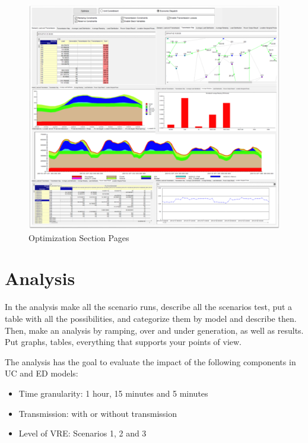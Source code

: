 \documentclass[12pt,LUDisStyle,twosided]{book}
\begin{document}
\begin{figure}[h] 
	\begin{center}
		\includegraphics[width=\textwidth,height=\textheight,keepaspectratio]{aimmsOptimizationSectionPages.png}
	  	\caption{Optimization Section Pages}
     	\label{fig:optimizationSectionPages}
	\end{center}
\end{figure}



\chapter{Analysis}

In the analysis make all the scenario runs, describe all the scenarios test, put a table with all the possibilities, and categorize them by model and describe then. Then, make an analysis by ramping, over and under generation, as well as results. Put graphs, tables, everything that supports your points of view.

The analysis has the goal to evaluate the impact of the following components in UC and ED models:

\begin{itemize}
\item Time granularity: 1 hour, 15 minutes and 5 minutes
\item Transmission: with or without transmission
\item Level of VRE: Scenarios 1, 2 and 3
\end{itemize}
\end{document}
